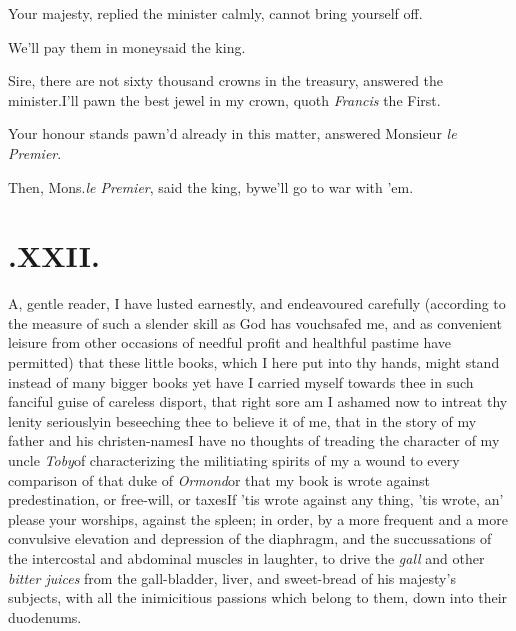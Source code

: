\documentclass{article}
\begin{document}
Your majesty, replied the minister\break
calmly, cannot bring yourself off.

We’ll pay them in money\tsh said the king.

Sire, there are not sixty thousand\break
crowns in the treasury, answered the\break
minister.\tsh I’ll pawn the best jewel\pb
in my crown, quoth \textit{Francis} the First.

Your honour stands pawn’d already\break
in this matter, answered Monsieur \textit{le Premier}.

Then, Mons.\@ \textit{le Premier}, said the king,
by\tsh we’ll go to war with ’em.

\baselineskip

\section{.\enspace XXII.}

\lettrine{A}{}, gentle reader, I have
lusted earnestly, and endeavoured
carefully (according to the measure of such a slender skill
as God has vouchsafed me, and as convenient leisure from
other occasions of needful profit and healthful pastime have
permitted) that these little books, which I here put into thy
hands,\pb
might stand instead of many bigger books\break
\tsk yet have I
carried myself towards thee in such fanciful guise of
careless disport, that right sore am I ashamed now to
intreat thy lenity seriously\tsk in beseeching thee to
believe it of me, that in the story of my father and his
christen-\break names\tsk I have no thoughts of treading 
the character of my uncle \textit{Toby}\tsk of characterizing
the militiating spirits of my  a wound to every comparison of that 
duke of \textit{Ormond}\tsk or that my book is wrote against
predestination, or free-will, or taxes\tsk If ’tis wrote
against any thing,\break
\tsh ’tis wrote, an’ please your worships,
against the spleen; in order, by a more\pb
frequent and a more convulsive elevation and depression of
the diaphragm, and the succussations of the intercostal and
abdominal muscles in laughter, to drive the \textit{gall}
and other \textit{bitter juices} from the gall-bladder,
liver, and sweet-bread of his majesty’s subjects, with all
the inimicitious passions which belong to them,\break
down into their duodenums.
\end{document}
